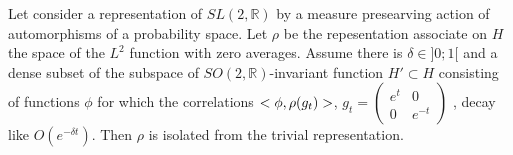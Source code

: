 \begin{prop}
Let consider a representation of $SL(2,\mathbb{R})$ by a measure presearving action of automorphisms of a probability space. Let $\rho$ be the repesentation associate on $H$ the space of the $L^2$ function with zero averages. Assume there is $\delta \in ]0;1[$ and a dense subset of the subspace of $SO(2,\mathbb{R})$-invariant function $H' \subset H$ consisting of functions $\phi$ for which the correlations $<\phi, \rho(g_t) \time \phi>$, $g_t=\begin{pmatrix} e^t & 0 \\ 0 & e^{-t} \end{pmatrix} $
, decay like $O(e^{- \delta t})$. Then $\rho$ is isolated from the trivial representation.
\cite{2005math.....11614A}
\end{prop}

\cite{ratner_1987}

